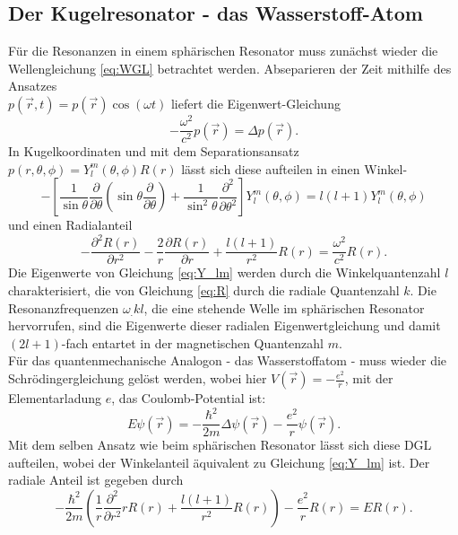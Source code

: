 \subsection{Der Kugelresonator - das Wasserstoff-Atom}

Für die Resonanzen in einem sphärischen Resonator muss zunächst wieder die Wellengleichung \eqref{eq:WGL} betrachtet werden. Abseparieren der Zeit mithilfe des Ansatzes\\
$p(\vec{r},t)=p(\vec{r})\cos{(\omega t)}$ liefert die Eigenwert-Gleichung
\begin{equation*}
-\frac{\omega^2}{c^2}p(\vec{r})=\Delta p(\vec{r})\text{.}
\end{equation*}
In Kugelkoordinaten und mit dem Separationsansatz $p(r,\theta,\phi)=Y^m_l(\theta,\phi)R(r)$ lässt sich diese aufteilen in einen Winkel-
\begin{equation}
-\left[\frac{1}{\sin{\theta}}\frac{\partial}{\partial\theta}\left(\sin{\theta}\frac{\partial}{\partial\theta}\right)+\frac{1}{\sin^2{\theta}}\frac{\partial^2}{\partial\theta^2}\right]Y^m_l(\theta,\phi)=l(l+1)Y^m_l(\theta,\phi)\label{eq:Y_lm}
\end{equation}
und einen Radialanteil 
\begin{equation}
-\frac{\partial^2 R(r)}{\partial r^2}-\frac{2}{r}\frac{\partial R(r)}{\partial r}+\frac{l(l+1)}{r^2}R(r)=\frac{\omega^2}{c^2}R(r)\text{.}\label{eq:R}
\end{equation}
Die Eigenwerte von Gleichung \eqref{eq:Y_lm} werden durch die Winkelquantenzahl $l$ charakterisiert, die von Gleichung \eqref{eq:R} durch die radiale Quantenzahl $k$. Die Resonanzfrequenzen $\omega_.{k l}$, die eine stehende Welle im sphärischen Resonator hervorrufen, sind die Eigenwerte dieser radialen Eigenwertgleichung und damit $(2l+1)$-fach entartet in der magnetischen Quantenzahl $m$.\\
\newline
Für das quantenmechanische Analogon - das Wasserstoffatom - muss wieder die Schrödingergleichung gelöst werden, wobei hier $V(\vec{r})=-\frac{e^2}{r}$, mit der Elementarladung $e$, das Coulomb-Potential ist:
\[
E\psi(\vec{r})=-\frac{\hbar^2}{2m}\Delta\psi(\vec{r})-\frac{e^2}{r}\psi(\vec{r})\text{.}
\]
Mit dem selben Ansatz wie beim sphärischen Resonator lässt sich diese DGL aufteilen, wobei der Winkelanteil äquivalent zu Gleichung \eqref{eq:Y_lm} ist. Der radiale Anteil ist gegeben durch 
\begin{equation}
-\frac{\hbar^2}{2m}\left(\frac{1}{r}\frac{\partial^2}{\partial r^2}r R(r)+\frac{l(l+1)}{r^2}R(r)\right)-\frac{e^2}{r}R(r)=E R(r)\text{.}\label{eq:R2}
\end{equation}

